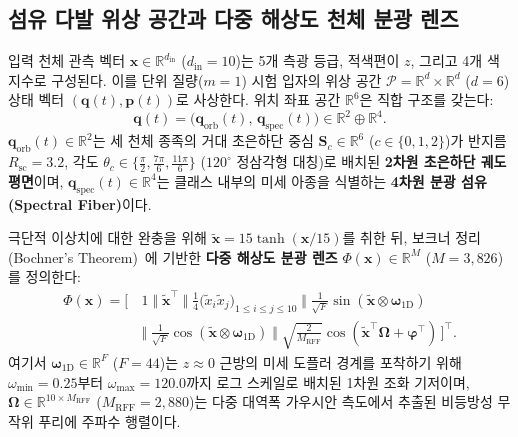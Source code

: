 \documentclass[journal]{IEEEtran}
\begin{document}
\subsection{섬유 다발 위상 공간과 다중 해상도 천체 분광 렌즈}
입력 천체 관측 벡터 $\mathbf{x} \in \mathbb{R}^{d_{\text{in}}}$ ($d_{\text{in}} = 10$)는 5개 측광 등급, 적색편이 $z$, 그리고 4개 색지수로 구성된다. 이를 단위 질량($m = 1$) 시험 입자의 위상 공간 $\mathcal{P} = \mathbb{R}^d \times \mathbb{R}^d$ ($d = 6$) 상태 벡터 $(\mathbf{q}(t), \mathbf{p}(t))$로 사상한다. 위치 좌표 공간 $\mathbb{R}^6$은 직합 구조를 갖는다:
\begin{equation}
  \mathbf{q}(t) = \big(\mathbf{q}_{\text{orb}}(t),\, \mathbf{q}_{\text{spec}}(t)\big) \in \mathbb{R}^2 \oplus \mathbb{R}^4.
  \label{eq:phase_space_decomp}
\end{equation}
$\mathbf{q}_{\text{orb}}(t) \in \mathbb{R}^2$는 세 천체 종족의 거대 초은하단 중심 $\mathbf{S}_c \in \mathbb{R}^6$ ($c \in \{0, 1, 2\}$)가 반지름 $R_{\text{sc}} = 3.2$, 각도 $\theta_c \in \{\frac{\pi}{2}, \frac{7\pi}{6}, \frac{11\pi}{6}\}$ ($120^\circ$ 정삼각형 대칭)로 배치된 \textbf{2차원 초은하단 궤도 평면}이며, $\mathbf{q}_{\text{spec}}(t) \in \mathbb{R}^4$는 클래스 내부의 미세 아종을 식별하는 \textbf{4차원 분광 섬유(Spectral Fiber)}이다.

극단적 이상치에 대한 완충을 위해 $\tilde{\mathbf{x}} = 15 \tanh(\mathbf{x}/15)$를 취한 뒤, 보크너 정리(Bochner's Theorem)~\cite{rahimi2007}에 기반한 \textbf{다중 해상도 분광 렌즈} $\Phi(\mathbf{x}) \in \mathbb{R}^M$ ($M = 3,826$)를 정의한다:
\begin{equation}
\begin{aligned}
  \Phi(\mathbf{x}) = \Big[\, &1 \;\Big\Vert\; \tilde{\mathbf{x}}^\top \;\Big\Vert\; \tfrac{1}{4}\big(\tilde{x}_i \tilde{x}_j\big)_{1 \le i \le j \le 10} \;\Big\Vert\; \tfrac{1}{\sqrt{F}}\sin(\tilde{\mathbf{x}} \otimes \boldsymbol{\omega}_{\text{1D}}) \\
  &\Big\Vert\; \tfrac{1}{\sqrt{F}}\cos(\tilde{\mathbf{x}} \otimes \boldsymbol{\omega}_{\text{1D}}) \;\Big\Vert\; \sqrt{\tfrac{2}{M_{\text{RFF}}}}\cos(\tilde{\mathbf{x}}^\top \boldsymbol{\Omega} + \boldsymbol{\varphi}^\top) \,\Big]^\top.
\end{aligned}
\end{equation}
여기서 $\boldsymbol{\omega}_{\text{1D}} \in \mathbb{R}^F$ ($F = 44$)는 $z \approx 0$ 근방의 미세 도플러 경계를 포착하기 위해 $\omega_{\min} = 0.25$부터 $\omega_{\max} = 120.0$까지 로그 스케일로 배치된 1차원 조화 기저이며, $\boldsymbol{\Omega} \in \mathbb{R}^{10 \times M_{\text{RFF}}}$ ($M_{\text{RFF}} = 2,880$)는 다중 대역폭 가우시안 측도에서 추출된 비등방성 무작위 푸리에 주파수 행렬이다.
\end{document}

